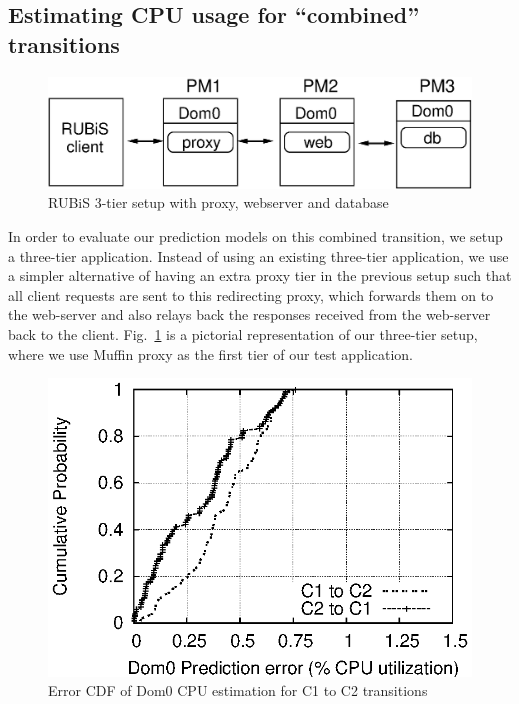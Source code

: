 \subsection{Estimating CPU usage for ``combined'' transitions}
\begin{figure}
	\centering
	\includegraphics[scale=0.425]{jss-figures/rubis-3tier-layout.eps}
	\caption{RUBiS 3-tier setup with proxy, webserver and database}
	\label{fig:threetier}
\end{figure}

In order to evaluate our prediction models on this combined transition,
we setup a three-tier application. Instead of using an existing three-tier
application, we use a simpler alternative of having an extra proxy
tier in the previous setup such that all client requests are
sent to this redirecting proxy, which forwards them on to the
web-server and also relays back the responses received from the
web-server back to the client. Fig.~\ref{fig:threetier}
is a pictorial representation of our
three-tier setup, where we use Muffin\cite{muffin} proxy
as the first tier of our test application.

\begin{figure}[h]
	\centering
	\includegraphics[scale=0.8]{jss-figures/aff-3tier/fwd_3tier_dom0_cdf.eps}
	\caption{Error CDF of Dom0 CPU estimation for C1 to C2 transitions}
	\label{fig:combined}
\end{figure}

